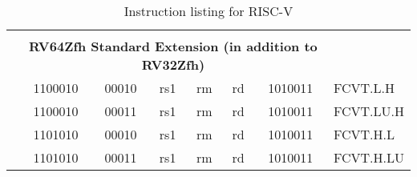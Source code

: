 \begin{table}[p]
\begin{small}
\begin{center}
\begin{tabular}{p{0in}p{0.4in}p{0.05in}p{0.05in}p{0.05in}p{0.05in}p{0.4in}p{0.6in}p{0.4in}p{0.6in}p{0.7in}l}
&
\multicolumn{10}{c}{} & \\
&
\multicolumn{10}{c}{\bf RV64Zfh Standard Extension (in addition to RV32Zfh)} & \\
\cline{2-11}


&
\multicolumn{4}{|c|}{1100010} &
\multicolumn{2}{c|}{00010} &
\multicolumn{1}{c|}{rs1} &
\multicolumn{1}{c|}{rm} &
\multicolumn{1}{c|}{rd} &
\multicolumn{1}{c|}{1010011} & FCVT.L.H \\
\cline{2-11}


&
\multicolumn{4}{|c|}{1100010} &
\multicolumn{2}{c|}{00011} &
\multicolumn{1}{c|}{rs1} &
\multicolumn{1}{c|}{rm} &
\multicolumn{1}{c|}{rd} &
\multicolumn{1}{c|}{1010011} & FCVT.LU.H \\
\cline{2-11}


&
\multicolumn{4}{|c|}{1101010} &
\multicolumn{2}{c|}{00010} &
\multicolumn{1}{c|}{rs1} &
\multicolumn{1}{c|}{rm} &
\multicolumn{1}{c|}{rd} &
\multicolumn{1}{c|}{1010011} & FCVT.H.L \\
\cline{2-11}


&
\multicolumn{4}{|c|}{1101010} &
\multicolumn{2}{c|}{00011} &
\multicolumn{1}{c|}{rs1} &
\multicolumn{1}{c|}{rm} &
\multicolumn{1}{c|}{rd} &
\multicolumn{1}{c|}{1010011} & FCVT.H.LU \\
\cline{2-11}


\end{tabular}
\end{center}
\end{small}
\caption{Instruction listing for RISC-V}
\end{table}


